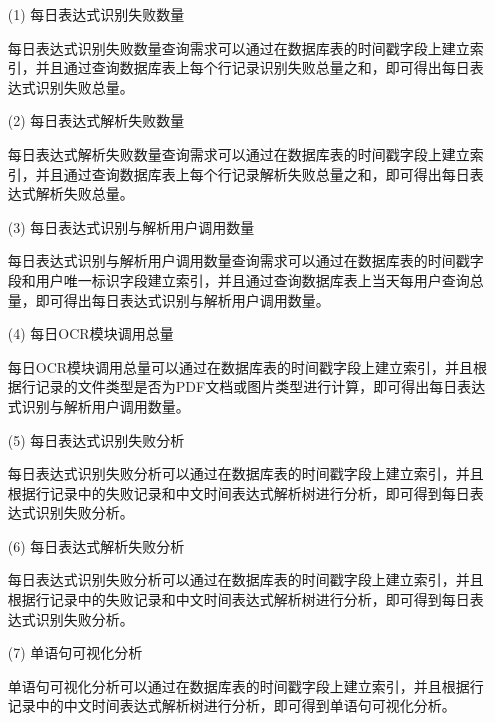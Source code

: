 \begin{enumerate}
  \item[(1)] 每日表达式识别失败数量

        每日表达式识别失败数量查询需求可以通过在数据库表的时间戳字段上建立索引，并且通过查询数据库表上每个行记录识别失败总量之和，即可得出每日表达式识别失败总量。

  \item[(2)] 每日表达式解析失败数量

        每日表达式解析失败数量查询需求可以通过在数据库表的时间戳字段上建立索引，并且通过查询数据库表上每个行记录解析失败总量之和，即可得出每日表达式解析失败总量。

  \item[(3)] 每日表达式识别与解析用户调用数量

        每日表达式识别与解析用户调用数量查询需求可以通过在数据库表的时间戳字段和用户唯一标识字段建立索引，并且通过查询数据库表上当天每用户查询总量，即可得出每日表达式识别与解析用户调用数量。

  \item[(4)] 每日OCR模块调用总量

        每日OCR模块调用总量可以通过在数据库表的时间戳字段上建立索引，并且根据行记录的文件类型是否为PDF文档或图片类型进行计算，即可得出每日表达式识别与解析用户调用数量。

  \item[(5)] 每日表达式识别失败分析

        每日表达式识别失败分析可以通过在数据库表的时间戳字段上建立索引，并且根据行记录中的失败记录和中文时间表达式解析树进行分析，即可得到每日表达式识别失败分析。

  \item[(6)] 每日表达式解析失败分析

        每日表达式识别失败分析可以通过在数据库表的时间戳字段上建立索引，并且根据行记录中的失败记录和中文时间表达式解析树进行分析，即可得到每日表达式识别失败分析。

  \item[(7)] 单语句可视化分析

        单语句可视化分析可以通过在数据库表的时间戳字段上建立索引，并且根据行记录中的中文时间表达式解析树进行分析，即可得到单语句可视化分析。
\end{enumerate}

